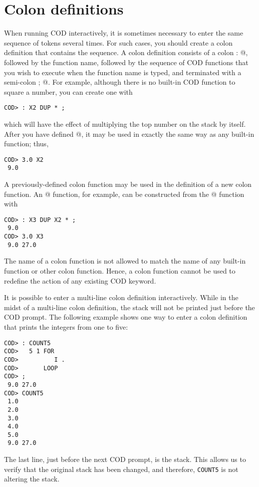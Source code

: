 \section{Colon definitions}
When running COD interactively,
it is sometimes necessary to enter the same sequence of tokens several times.
For such cases, you should create a colon definition
that contains the sequence.
A colon definition consists of a colon \verb@ : @,
followed by the function name,
followed by the sequence of COD functions that you wish to execute
when the function name is typed,
and terminated with a semi-colon \verb@ ; @\@.
For example, although there is no built-in COD function to square a number,
you can create one with
\begin{verbatim}
COD> : X2 DUP * ;
\end{verbatim}
which will have the effect of multiplying the top number on the
stack by itself.
After you have defined @,
it may be used in exactly the same way as any built-in function; thus,
\begin{verbatim}
COD> 3.0 X2
 9.0
\end{verbatim}
A previously-defined colon function
may be used in the definition of a new colon function.
An @ function, for example,
can be constructed from the @ function with
\begin{verbatim}
COD> : X3 DUP X2 * ;
 9.0
COD> 3.0 X3
 9.0 27.0
\end{verbatim}
The name of a colon function is not allowed to match
the name of any built-in function or other colon function.
Hence, a colon function cannot be used
to redefine the action of any existing COD keyword.

It is possible to enter a multi-line colon definition interactively.
While in the midst of a multi-line colon definition,
the stack will not be printed just before the COD prompt.
The following example shows one way to enter a colon definition
that prints the integers from one to five:
\begin{verbatim}
COD> : COUNT5
COD>   5 1 FOR
COD>          I .
COD>       LOOP
COD> ;
 9.0 27.0
COD> COUNT5
 1.0
 2.0
 3.0
 4.0
 5.0
 9.0 27.0
\end{verbatim}
The last line, just before the next COD prompt, is the stack.
This allows us to verify that the original stack has been changed,
and therefore, {\tt COUNT5} is not altering the stack.

